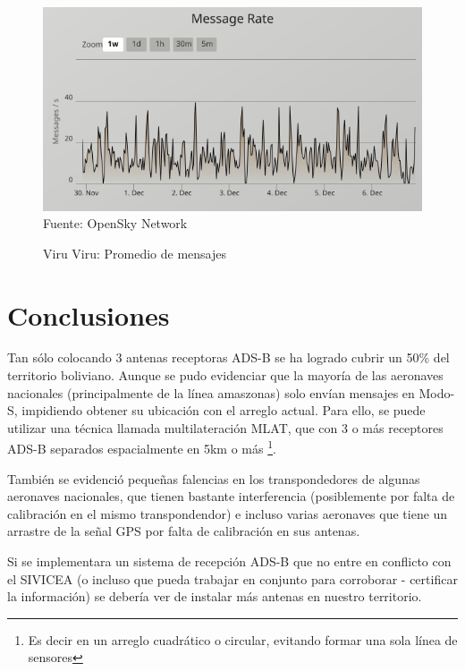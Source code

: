 \documentclass[fleqn,10pt]{SelfArx} %
\begin{document}
\begin{figure}[ht]
\caption{Viru Viru: Promedio de mensajes}
\centering
\includegraphics[width=0.8\linewidth]{vvi_mes.png}
\newline Fuente: OpenSky Network
\label{fig:vvi_mes}
\end{figure}

\section{Conclusiones}

Tan sólo colocando 3 antenas receptoras ADS-B se ha logrado cubrir un 50\% del territorio boliviano. Aunque se pudo evidenciar que la mayoría de las aeronaves nacionales (principalmente de la línea amaszonas) solo envían mensajes en Modo-S, impidiendo obtener su ubicación con el arreglo actual. Para ello, se puede utilizar una técnica llamada multilateración MLAT, que con 3 o más receptores ADS-B separados espacialmente en 5km o más \footnote{Es decir en un arreglo cuadrático o circular, evitando formar una sola línea de sensores}.

También se evidenció pequeñas falencias en los transpondedores de algunas aeronaves nacionales, que tienen bastante interferencia (posiblemente por falta de calibración en el mismo transpondendor) e incluso varias aeronaves que tiene un arrastre de la señal GPS por falta de calibración en sus antenas.

Si se implementara un sistema de recepción ADS-B que no entre en conflicto con el SIVICEA (o incluso que pueda trabajar en conjunto para corroborar - certificar la información) se debería ver de instalar más antenas en nuestro territorio.


{}

\end{document}
